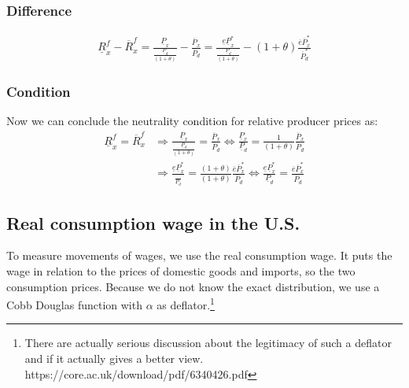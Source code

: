 \subsubsection*{Difference}
\begin{equation}\label{xpro.diff}
\begin{aligned}
\underline R^f_x - \overline R^f_x = \frac{\underline P_x}{\frac{\underline P_d}{ \left( 1+\theta \right) }} - \frac{\overline P_x}{\overline P_d} = \frac{\underline e \underline P^*_x}{\frac{\underline P_d}{ \left( 1+\theta \right) }} -  \left( 1+\theta \right) \frac{\overline e \overline P^*_x}{\overline P^*_d}
\end{aligned} 
\end{equation}

\subsubsection*{Condition}
Now we can conclude the neutrality condition for relative producer prices as:
\begin{equation}\label{xpro.diff}
\begin{aligned}
    \underline R^f_x = \overline R^f_x &\Rightarrow  \frac{\underline P_x}{\frac{\underline P_d}{ \left( 1+\theta \right) }} = \frac{\overline P_x}{\overline P_d} \Leftrightarrow \frac{\underline P_x}{\underline P_d} = \frac{1}{ \left( 1+\theta \right) } \frac{\overline P_x}{\overline P_d} \\ &\Rightarrow \frac{\underline e \underline P^*_x}{\frac{}{\underline P_d}} =  \frac{\left( 1+\theta \right)}{\left( 1+\theta \right)} \frac{\overline e \overline P^*_x}{\overline P_d} \Leftrightarrow \frac{\underline e \underline P^*_x}{\underline P_d} = \frac{\overline e \overline P^*_x}{\overline P_d}
\end{aligned} 
\end{equation}

\subsection*{Real consumption wage in the U.S.}
To measure movements of wages, we use the real consumption wage. It puts the wage in relation to the prices of domestic goods and imports, so the two consumption prices. Because we do not know the exact distribution, we use a Cobb Douglas function with $\alpha$ as deflator.\footnote{There are actually serious discussion about the legitimacy of such a deflator and if it actually gives a better view. https://core.ac.uk/download/pdf/6340426.pdf}


